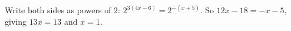 Write both sides as powers of $2$: $2^{3(4x-6)}=2^{-(x+5)}$. So $12x-18=-x-5$, giving $13x=13$ and $x=\boxed{1}$.
